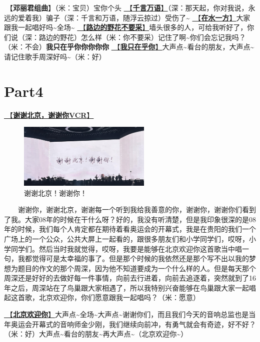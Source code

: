 \documentclass[]{ctexbook}
\begin{document}
🎵【\textbf{邓丽君组曲}】（米：宝贝）宝你个头
\hyperref[thousands-of-words]{🎵【\textbf{千言万语}】}（深：那天起，你对我说，永远的爱着我）骗子（深：千言和万语，随浮云掠过）受伤了\textasciitilde{}
\hyperref[on-the-water-side]{🎵【\textbf{在水一方}】}大家跟我一起唱好吗\textasciitilde 全场\textasciitilde{}
\hyperref[only-with-me]{🎵【\textbf{路边的野花不要采}】}墙头很多的人，可给我听好了，你们说（深：路边的野花）怎么样（米：你不要采）记住了啊\textasciitilde 你们会忘记我吗？（米：不会）\textbf{我只在乎你你你你你}
\hyperref[only-you]{🎵【\textbf{我只在乎你}】}大声点\textasciitilde 看台的朋友，大声点\textasciitilde 请记住歌手周深好吗\textasciitilde（米：好）

\section{Part4}\label{beijing-20240922-part4}

\hyperref[thank-you-vcr]{🎥【\textbf{谢谢北京，谢谢你VCR}】}

\begin{figure}

{\centering \includegraphics[width=180pt]{img/beijing20240921/thank-beijing} 

}

\caption{谢谢北京！谢谢你！}\label{fig:unnamed-chunk-89}
\end{figure}

  谢谢你，谢谢北京，谢谢每一个听到我给我善意的你，谢谢你，谢谢你们看到了我。大家08年的时候在干什么呀？好的，我没有听清楚，但是我印象很深的是08年的时候，我们每个人肯定都在期待着看奥运会的开幕式，我是在贵阳的我们一个广场上的一个公众，公共大屏上一起看的，跟很多朋友们和小学同学们，哎呀，小学同学们。然后当时我就觉得，哎呀，我要是能够在北京欢迎你这首歌当中唱一句，我都觉得可是太幸福的事了。但是那个时候的我依然还是那个写不出以我的梦想为题目的作文的那个周深，因为他不知道要成为一个什么样的人。但是每天那个周深还是好好的去做好每一件事情，向前去行进着，向前去追逐着，突然就到了16年之后，周深站在了鸟巢跟大家相遇了，所以我特别兴奋能够在鸟巢跟大家一起唱起这首歌，北京欢迎你，你们愿意跟我一起唱吗？（米：愿意）

\hyperref[welcome-to-beijing]{🎵【\textbf{北京欢迎你}】}大声点\textasciitilde 全场\textasciitilde 大声点\textasciitilde 谢谢你们，而且我们今天的音响总监也是当年奥运会开幕式的音响师金少刚，我们继续向前冲，有勇气就会有奇迹，好不好？（米：好）大声点\textasciitilde 看台的朋友\textasciitilde 再大声点\textasciitilde（北京欢迎你\textasciitilde）
\end{document}
